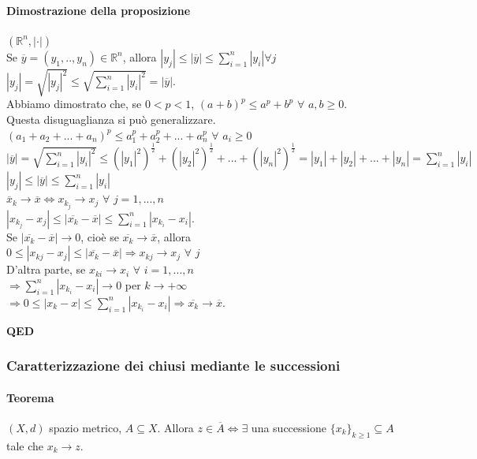 \documentclass{article}
\newcommand{\R}{\mathbb{R}}
\begin{document}
\paragraph{{Dimostrazione della proposizione}}
$(\R^n, |\cdot|)$\\
Se $\overline{y}=(y_1,..,y_n)\in \R^n$, allora $|y_j|\leq |\overline{y}|\leq \sum_{i=1}^{n}|y_i| \forall j$\\
$|y_j| = \sqrt{|y_j|^2} \leq \sqrt{\sum_{i=1}^{n}|y_i|^2} = |\overline{y}|$.\\
Abbiamo dimostrato che, se $0 <p<1$, $(a+b)^p\leq a^p+b^p \,\, \forall\,\, a,b \geq 0$.\\
Questa disuguaglianza si può generalizzare.\\
$(a_1+a_2+...+a_n)^p\leq a_1^p+a_2^p+...+a_n^p \,\, \forall\,\, a_i \geq 0$\\
$|\overline{y}|=\sqrt{\sum_{i=1}^{n}|y_i|^2} \leq (|y_1|^2)^{\frac{1}{2}}+(|y_2|^2)^{\frac{1}{2}}+...+(|y_n|^2)^{\frac{1}{2}}= |y_1|+|y_2|+...+|y_n|= \sum_{i=1}^{n}|y_i|$\\
$|y_j|\leq |\overline{y}| \leq \sum_{i=1}^{n}|y_i|$\\
$\overline{x}_k \rightarrow \overline{x} \Leftrightarrow x_{k_j} \rightarrow x_j \,\, \forall\,\, j=1,...,n$\\
$|x_{k_j}-x_j|\leq |\overline{x_k}-\overline{x}| \leq \sum_{i=1}^{n}|x_{k_i}-x_i|$.\\
Se $|\overline{x_k} - \overline{x}|\rightarrow 0 $, cioè se $\overline{x_k}\rightarrow \overline{x}$, allora\\
$0 \leq |x_{kj}-x_j|\leq |\overline{x_k}-\overline{x}| \Rightarrow x_{kj} \rightarrow x_j \,\, \forall \,\, j$\\
D'altra parte, se $x_{ki} \rightarrow  x_i \,\, \forall \,\, i=1,...,n $\\
$\Rightarrow \sum_{i=1}^{n}|x_{k_i}- x_i| \rightarrow 0 $ per $k \rightarrow + \infty$\\
$\Rightarrow 0 \leq |x_{k}- x| \leq \sum_{i=1}^{n}|x_{k_i}- x_i| \Rightarrow \overline{x_k} \rightarrow \overline{x}$.
\begin{flushright}
\textbf{QED}
\end{flushright}

\subsubsection{Caratterizzazione dei chiusi mediante le successioni}
\paragraph{Teorema}
$(X,d)$ spazio metrico, $A \subseteq X$. Allora $z\in \overline{A}\Leftrightarrow \exists$ una successione $\{x_k\}_{k\geq 1} \subseteq A $ tale che $x_k \rightarrow z$.
\end{document}
